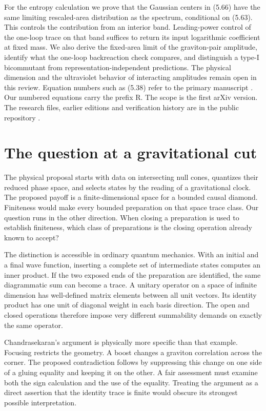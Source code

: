 \documentclass[11pt]{article}
\begin{document}
For the entropy calculation we prove that the Gaussian centers in (5.66) have the same limiting rescaled-area distribution as the spectrum, conditional on (5.63). This controls the contribution from an interior band. Leading-power control of the one-loop trace on that band suffices to return its input logarithmic coefficient at fixed mass. We also derive the fixed-area limit of the graviton-pair amplitude, identify what the one-loop backreaction check compares, and distinguish a type-I bicommutant from representation-independent predictions. The physical dimension and the ultraviolet behavior of interacting amplitudes remain open in this review.
\clearpage
\thispagestyle{plain}\tableofcontents
\vfill\noindent\small Equation numbers such as (5.38) refer to the primary manuscript \cite{VC}. Our numbered equations carry the prefix R. The scope is the first arXiv version. The research files, earlier editions and verification history are in the public repository \cite{repo}.\normalsize
\clearpage{}
\renewcommand{\theequation}{R\arabic{equation}}

\section{The question at a gravitational cut}
The physical proposal starts with data on intersecting null cones, quantizes their reduced phase space, and selects states by the reading of a gravitational clock. The proposed payoff is a finite-dimensional space for a bounded causal diamond. Finiteness would make every bounded preparation on that space trace class. Our question runs in the other direction. When closing a preparation is used to establish finiteness, which class of preparations is the closing operation already known to accept?

The distinction is accessible in ordinary quantum mechanics. With an initial and a final wave function, inserting a complete set of intermediate states computes an inner product. If the two exposed ends of the preparation are identified, the same diagrammatic sum can become a trace. A unitary operator on a space of infinite dimension has well-defined matrix elements between all unit vectors. Its identity product has one unit of diagonal weight in each basis direction. The open and closed operations therefore impose very different summability demands on exactly the same operator.

Chandrasekaran's argument is physically more specific than that example. Focusing restricts the geometry. A boost changes a graviton correlation across the corner. The proposed contradiction follows by suppressing this change on one side of a gluing equality and keeping it on the other. A fair assessment must examine both the sign calculation and the use of the equality. Treating the argument as a direct assertion that the identity trace is finite would obscure its strongest possible interpretation.
\end{document}
